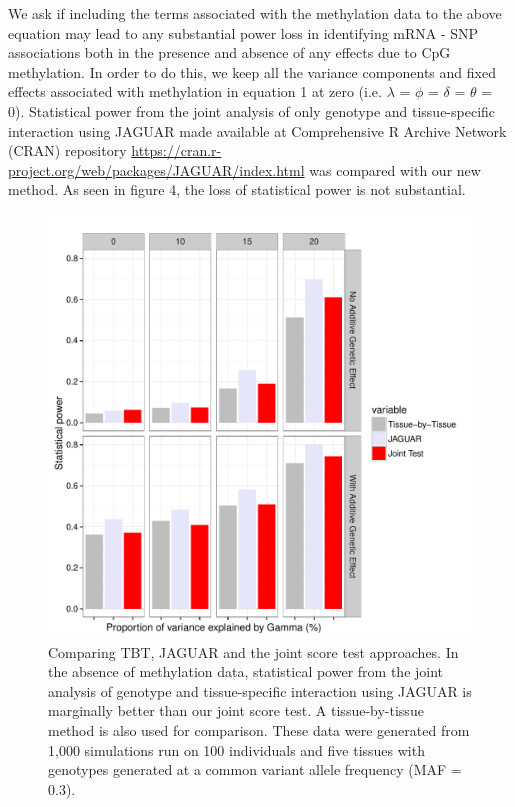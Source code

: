 \documentclass[hidelinks]{article}
\begin{document}
We ask if including the terms associated with the methylation data to the above equation may lead to any substantial power loss in identifying mRNA - SNP associations both in the presence and absence of any effects due to CpG methylation. In order to do this, we keep all the variance components and fixed effects associated with methylation in equation 1 at zero (i.e. $\lambda$ = $\phi$ = $\delta$ = $\theta$ = 0). Statistical power from the joint analysis of only genotype and tissue-specific interaction using JAGUAR \cite{jaguar_cran} made available at Comprehensive R Archive Network (CRAN) repository \url{https://cran.r-project.org/web/packages/JAGUAR/index.html} was compared with our new method. As seen in figure 4, the loss of statistical power is not substantial. 
\begin{center}
\begin{figure}[!ht]
\includegraphics[width=\textwidth]{JT_JAG_TBT.pdf}
\caption{Comparing TBT, JAGUAR and the joint score test approaches.  In the absence of methylation data, statistical power from the joint analysis of genotype and tissue-specific interaction using JAGUAR is marginally better than our joint score test. A tissue-by-tissue method is also used for comparison. These data were generated from 1,000 simulations run on 100 individuals and five tissues with genotypes generated at a common variant allele frequency (MAF = 0.3).}
\end{figure}
\end{center}
\end{document}
